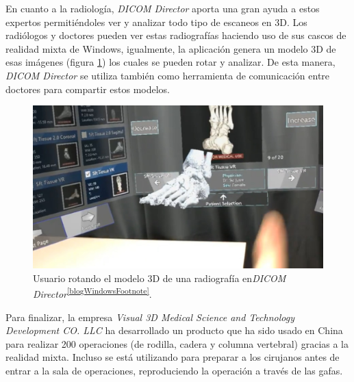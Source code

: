 En cuanto a la radiología, \textit{DICOM Director} aporta una gran ayuda a estos expertos permitiéndoles ver y analizar todo tipo de escaneos en 3D. Los radiólogos y doctores pueden ver estas radiografías haciendo uso de sus cascos de realidad mixta de Windows, igualmente, la aplicación genera un modelo 3D de esas imágenes (figura \ref{fig:dicomDirector}) los cuales se pueden rotar y analizar. De esta manera, \textit{DICOM Director} se utiliza también como herramienta de comunicación entre doctores para compartir estos modelos.

\begin{figure}[H]
    \centering    \includegraphics[scale=0.2]{Images/Estado del arte/dicomdirector.jpg}
    \caption{Usuario rotando el modelo 3D de una radiografía en\textit{DICOM Director}\textsuperscript{\ref{blogWindowsFootnote}}.}
    \label{fig:dicomDirector}
\end{figure}

Para finalizar, la empresa \textit{Visual 3D Medical Science and Technology Development CO. LLC} ha desarrollado un producto que ha sido usado en China para realizar 200 operaciones (de rodilla, cadera y columna vertebral) gracias a la realidad mixta. Incluso se está utilizando para preparar a los cirujanos antes de entrar a la sala de operaciones, reproduciendo la operación a través de las gafas. 






